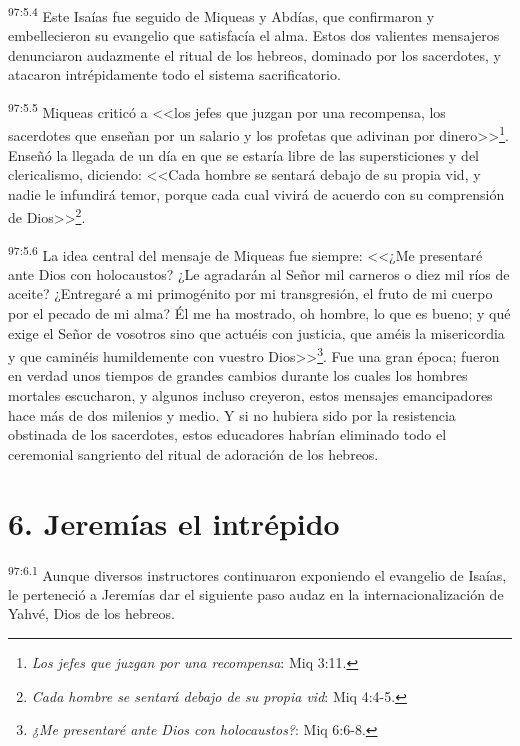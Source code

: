 \par
\textsuperscript{97:5.4} Este Isaías fue seguido de Miqueas y Abdías, que confirmaron y embellecieron su evangelio que satisfacía el alma. Estos dos valientes mensajeros denunciaron audazmente el ritual de los hebreos, dominado por los sacerdotes, y atacaron intrépidamente todo el sistema sacrificatorio.

\par
\textsuperscript{97:5.5} Miqueas criticó a <<los jefes que juzgan por una recompensa, los sacerdotes que enseñan por un salario y los profetas que adivinan por dinero>>\footnote{\textit{Los jefes que juzgan por una recompensa}: Miq 3:11.}. Enseñó la llegada de un día en que se estaría libre de las supersticiones y del clericalismo, diciendo: <<Cada hombre se sentará debajo de su propia vid, y nadie le infundirá temor, porque cada cual vivirá de acuerdo con su comprensión de Dios>>\footnote{\textit{Cada hombre se sentará debajo de su propia vid}: Miq 4:4-5.}.

\par
\textsuperscript{97:5.6} La idea central del mensaje de Miqueas fue siempre: <<¿Me presentaré ante Dios con holocaustos? ¿Le agradarán al Señor mil carneros o diez mil ríos de aceite? ¿Entregaré a mi primogénito por mi transgresión, el fruto de mi cuerpo por el pecado de mi alma? Él me ha mostrado, oh hombre, lo que es bueno; y qué exige el Señor de vosotros sino que actuéis con justicia, que améis la misericordia y que caminéis humildemente con vuestro Dios>>\footnote{\textit{¿Me presentaré ante Dios con holocaustos?}: Miq 6:6-8.}. Fue una gran época; fueron en verdad unos tiempos de grandes cambios durante los cuales los hombres mortales escucharon, y algunos incluso creyeron, estos mensajes emancipadores hace más de dos milenios y medio. Y si no hubiera sido por la resistencia obstinada de los sacerdotes, estos educadores habrían eliminado todo el ceremonial sangriento del ritual de adoración de los hebreos.

\section*{6. Jeremías el intrépido}
\par
\textsuperscript{97:6.1} Aunque diversos instructores continuaron exponiendo el evangelio de Isaías, le perteneció a Jeremías dar el siguiente paso audaz en la internacionalización de Yahvé, Dios de los hebreos.

